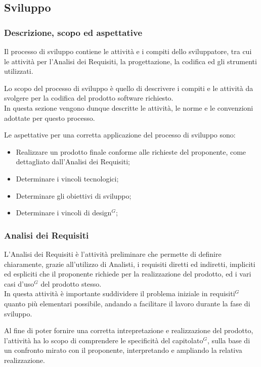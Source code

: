 \subsection{Sviluppo}

\subsubsection{Descrizione, scopo ed aspettative}

Il processo di sviluppo contiene le attività e i compiti dello sviluppatore, tra cui le attività per l’Analisi dei Requisiti, la progettazione, la codifica ed gli strumenti utilizzati.

Lo scopo del processo di sviluppo è quello di descrivere i compiti e le attività da svolgere per la codifica del prodotto software richiesto. \\
In questa sezione vengono dunque descritte le attività, le norme e le convenzioni adottate per questo processo.

Le aspettative per una corretta applicazione del processo di sviluppo sono:
\begin{itemize}
    \item Realizzare un prodotto finale conforme alle richieste del proponente, come dettagliato dall'Analisi dei Requisiti;
    \item Determinare i vincoli tecnologici;
    \item Determinare gli obiettivi di sviluppo;
    \item Determinare i vincoli di design$^{G}$;
\end{itemize}
\subsubsection{Analisi dei Requisiti}


L’Analisi dei Requisiti è l’attività preliminare che permette di definire chiaramente, grazie all'utilizzo di Analisti, i requisiti diretti ed indiretti, 
impliciti ed espliciti che il proponente richiede per la realizzazione del prodotto, ed i vari casi d’uso$^{G}$ del prodotto stesso. \\
In questa attività è importante suddividere il problema iniziale in requisiti$^{G}$ quanto più elementari possibile, andando a facilitare il lavoro durante la fase di sviluppo.

Al fine di poter fornire una corretta intrepretazione e realizzazione del prodotto, l'attività ha lo scopo di comprendere le specificità del capitolato$^{G}$, sulla base di un confronto mirato con il proponente, interpretando e ampliando la relativa realizzazione.
\pagebreak
   
